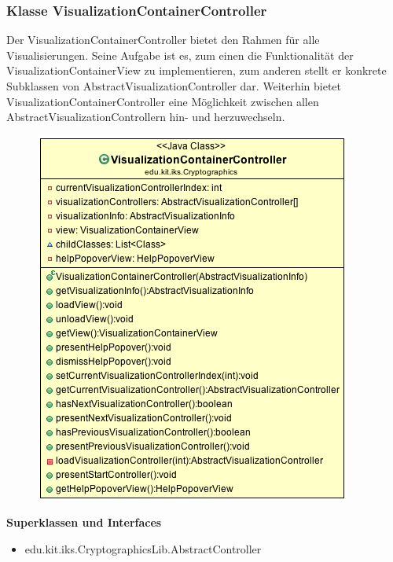 \documentclass{article}
\begin{document}
    \subsubsection{Klasse VisualizationContainerController}
      Der VisualizationContainerController bietet den Rahmen für alle Visualisierungen. Seine Aufgabe ist es, zum einen die Funktionalität der VisualizationContainerView zu implementieren, zum anderen stellt er konkrete Subklassen von AbstractVisualizationController dar. Weiterhin bietet VisualizationContainerController eine Möglichkeit zwischen allen AbstractVisualizationControllern hin- und herzuwechseln.
      \begin{figure}[H]
        \centering
        \includegraphics{resources/edu-kit-iks-Cryptographics-VisualizationContainerController}
      \end{figure}

      \textbf{Superklassen und Interfaces}
      \begin{itemize}
        \item edu.kit.iks.CryptographicsLib.AbstractController
      \end{itemize}
      
\end{document}
